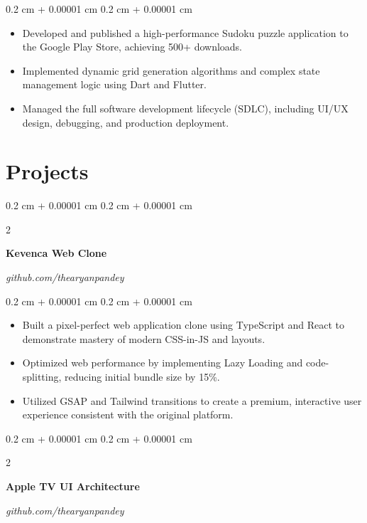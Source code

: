 \documentclass[10pt, a4paper]{article}
\newenvironment{highlights}{
    \begin{itemize}[
        topsep=0.10 cm,
        parsep=0.10 cm,
        partopsep=0pt,
        itemsep=0pt,
        leftmargin=0.4 cm + 10pt
    ]
}{
    \end{itemize}
} %
\newenvironment{onecolentry}{
    \begin{adjustwidth}{
        0.2 cm + 0.00001 cm
    }{
        0.2 cm + 0.00001 cm
    }
}{
    \end{adjustwidth}
} %
\newenvironment{twocolentry}[2][]{
    \onecolentry
    \def\secondColumn{#2}
    \setcolumnwidth{\fill, 4.5 cm}
    \begin{paracol}{2}
}{
    \switchcolumn \raggedleft \secondColumn
    \end{paracol}
    \endonecolentry
} %
\begin{document}
        \vspace{0.10 cm}
        \begin{onecolentry}
        \begin{highlights}
            \item Developed and published a high-performance Sudoku puzzle application to the Google Play Store, achieving 500+ downloads.
\item Implemented dynamic grid generation algorithms and complex state management logic using Dart and Flutter.
\item Managed the full software development lifecycle (SDLC), including UI/UX design, debugging, and production deployment.
        \end{highlights}
        \end{onecolentry}
        \vspace{0.2 cm}
        

    \section{Projects}
\begin{twocolentry}{
        \textit{github.com/thearyanpandey}
    }
    \textbf{Kevenca Web Clone}
    \end{twocolentry}

    \vspace{0.10 cm}
    \begin{onecolentry}
    \begin{highlights}
        \item Built a pixel-perfect web application clone using TypeScript and React to demonstrate mastery of modern CSS-in-JS and layouts.
\item Optimized web performance by implementing Lazy Loading and code-splitting, reducing initial bundle size by 15\%.
\item Utilized GSAP and Tailwind transitions to create a premium, interactive user experience consistent with the original platform.
    \end{highlights}
    \end{onecolentry}
    \vspace{0.2 cm}
\begin{twocolentry}{
        \textit{github.com/thearyanpandey}
    }
    \textbf{Apple TV UI Architecture}
    \end{twocolentry}
\end{document}
